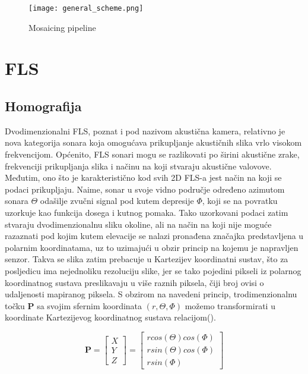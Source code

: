 \documentclass[times, utf8, diplomski]{fer}
\begin{document}
\begin{figure}[htb]
\centering
\texttt{[image: general\_scheme.png]}
\caption{Mosaicing pipeline}
\label{fig:Mosaicing-pipeline}
\end{figure}


\chapter{FLS}

\section{Homografija }
Dvodimenzionalni FLS, poznat i pod nazivom akustična kamera, relativno je nova kategorija sonara koja omogućava prikupljanje akustičnih slika vrlo visokom frekvencijom. Općenito, FLS sonari mogu se razlikovati po širini akustične zrake, frekvenciji prikupljanja slika i načinu na koji stvaraju akustične valovove. Međutim, ono što je karakteristično kod svih 2D FLS-a jest način na koji se podaci prikupljaju. Naime, sonar u svoje vidno područje određeno azimutom sonara $\Theta$ odašilje zvučni signal pod kutem depresije  $\Phi$, koji se na povratku uzorkuje kao funkcija dosega i kutnog pomaka. Tako uzorkovani podaci zatim stvaraju dvodimenzionalnu sliku okoline, ali na način na koji nije moguće razaznati pod kojim kutem elevacije se nalazi pronađena značajka predstavljena u polarnim koordinatama, uz to uzimajući u obzir princip na kojemu je napravljen senzor. Takva se slika zatim prebacuje u Kartezijev koordinatni sustav, što za posljedicu ima nejednoliku rezoluciju slike, jer se tako pojedini pikseli iz polarnog koordinatnog sustava preslikavaju u više raznih piksela, čiji broj ovisi o udaljenosti mapiranog piksela. 
S obzirom na navedeni princip, trodimenzionalnu točku \textbf{P} sa svojim sfernim koordinata $(r,\Theta,\Phi)$ možemo transformirati u koordinate Kartezijevog koordinatnog sustava relacijom().

$$\textbf{P} = \begin{bmatrix}
X \\
Y \\
Z
\end{bmatrix} = \begin{bmatrix}
r cos(\Theta) cos(\Phi)\\
r sin(\Theta) cos(\Phi) \\
r sin(\Phi) 

\end{bmatrix} $$
\end{document}
